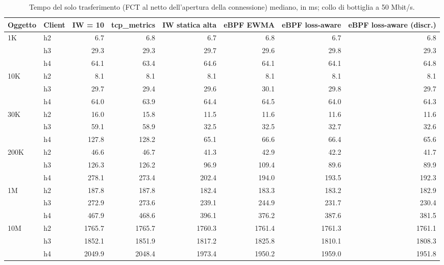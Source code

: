 \begin{table}[htbp]
  \centering
  \caption{Tempo del solo trasferimento (FCT al netto dell'apertura della connessione) mediano, in ms; collo di bottiglia a 50 Mbit/s.}
  \label{tab:trasf-med-50}
  \begin{tabular}{llrrrrrr}
    \toprule
    Oggetto & Client & IW = 10 & tcp\_metrics & IW statica alta & eBPF EWMA & eBPF loss-aware & eBPF loss-aware (discr.) \\
    \midrule
    1K & h2 & 6.7 & 6.8 & 6.7 & 6.8 & 6.7 & 6.8 \\
     & h3 & 29.3 & 29.3 & 29.7 & 29.6 & 29.8 & 29.3 \\
     & h4 & 64.1 & 63.4 & 64.6 & 64.1 & 64.1 & 64.8 \\
    \addlinespace
    10K & h2 & 8.1 & 8.1 & 8.1 & 8.1 & 8.1 & 8.1 \\
     & h3 & 29.7 & 29.4 & 29.6 & 30.1 & 29.8 & 29.7 \\
     & h4 & 64.0 & 63.9 & 64.4 & 64.5 & 64.0 & 64.3 \\
    \addlinespace
    30K & h2 & 16.0 & 15.8 & 11.5 & 11.6 & 11.6 & 11.6 \\
     & h3 & 59.1 & 58.9 & 32.5 & 32.5 & 32.7 & 32.6 \\
     & h4 & 127.8 & 128.2 & 65.1 & 66.6 & 66.4 & 65.6 \\
    \addlinespace
    200K & h2 & 46.6 & 46.7 & 41.3 & 42.9 & 42.2 & 41.7 \\
     & h3 & 126.3 & 126.2 & 96.9 & 109.4 & 89.6 & 89.9 \\
     & h4 & 278.1 & 273.4 & 202.4 & 194.0 & 193.5 & 192.3 \\
    \addlinespace
    1M & h2 & 187.8 & 187.8 & 182.4 & 183.3 & 183.2 & 182.9 \\
     & h3 & 272.9 & 273.6 & 239.1 & 244.9 & 231.7 & 230.4 \\
     & h4 & 467.9 & 468.6 & 396.1 & 376.2 & 387.6 & 381.5 \\
    \addlinespace
    10M & h2 & 1765.7 & 1765.7 & 1760.3 & 1761.4 & 1761.3 & 1761.1 \\
     & h3 & 1852.1 & 1851.9 & 1817.2 & 1825.8 & 1810.1 & 1808.3 \\
     & h4 & 2049.9 & 2048.4 & 1973.4 & 1950.2 & 1959.0 & 1951.8 \\
    \bottomrule
  \end{tabular}
\end{table}
